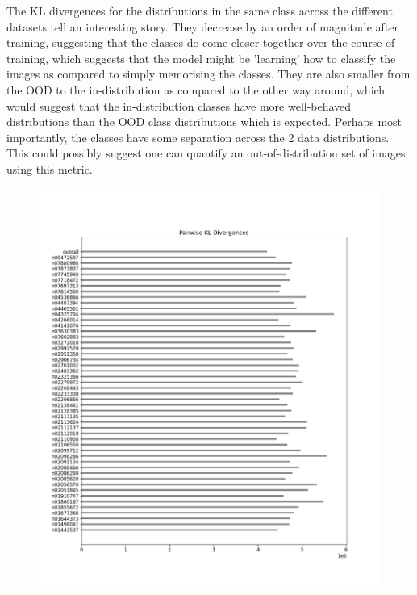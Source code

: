 \documentclass{article}
\begin{document}
    The KL divergences for the distributions in the same class across the different datasets tell an interesting story. They decrease by an order of magnitude after training, suggesting that the classes do come closer together over the course of training, which suggests that the model might be 'learning' how to classify the images as compared to simply memorising the classes. They are also smaller from the OOD to the in-distribution as compared to the other way around, which would suggest that the in-distribution classes have more well-behaved distributions than the OOD class distributions which is expected. Perhaps most importantly, the classes have some separation across the 2 data distributions. This could possibly suggest one can quantify an out-of-distribution set of images using this metric.
    \begin{figure}[H]
        \centering
        \begin{minipage}{0.45\textwidth}
            \centering
            \includegraphics[width=\textwidth]{cross_imagenet_imgr_r_untrained/alexnet_kl_div_a_to_bpairwise.png} %
            

\end{minipage}
\end{figure}
\end{document}
